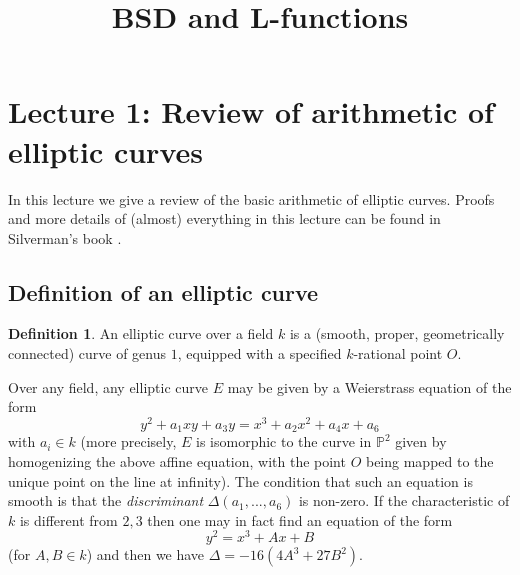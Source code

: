 \documentclass[12pt]{amsart}
\numberwithin{equation}{section}
\theoremstyle{remark}
\theoremstyle{definition}
\theoremstyle{definition}
\theoremstyle{definition}
\newtheorem{defi}[equation]{Definition}
\theoremstyle{definition}
\theoremstyle{definition}
\theoremstyle{definition}
\theoremstyle{definition}
\begin{document}
\title{BSD and L-functions}



\maketitle


  


\section{Lecture 1: Review of arithmetic of elliptic curves}

In this lecture we give a review of the basic arithmetic of elliptic curves. Proofs and more details of (almost) everything in this lecture can be found in Silverman's book \cite{MR2514094}. 

\subsection{Definition of an elliptic curve}

\begin{defi}
An elliptic curve over a field $k$ is a  (smooth, proper, geometrically connected) curve of genus $1$, equipped with a specified $k$-rational point $O$.
\end{defi}

Over any field, any elliptic curve $E$ may be given by a Weierstrass equation of the form
\[y^2+a_1xy+a_3y=x^3+a_2x^2+a_4x+a_6\]
with $a_i\in k$ (more precisely, $E$ is isomorphic to the curve in $\mathbb{P}^2$ given by homogenizing the above affine equation, with the point $O$ being mapped to the unique point on the line at infinity). The condition that such an equation is smooth is that the \textit{discriminant} $\Delta(a_1,...,a_6)$ is non-zero. If the characteristic of $k$ is different from $2,3$ then one may in fact find an equation of the form
\[y^2=x^3+Ax+B\]
(for $A,B\in k$) and then we have $\Delta=-16(4A^3+27B^2)$. 
\end{document}

